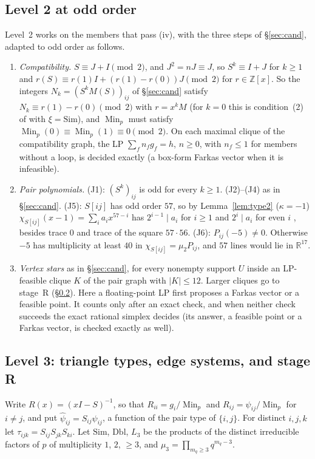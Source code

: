 \documentclass[11pt]{article}
\theoremstyle{definition}
\newcommand{\Z}{\mathbb{Z}}
\newcommand{\R}{\mathbb{R}}
\newcommand{\Min}{\operatorname{Min}}
\begin{document}
\subsection{Level 2 at odd order}
Level~2 works on the members that pass (iv), with the three steps of \S\ref{sec:cand}, adapted to odd
order as follows.
\begin{enumerate}
\item \emph{Compatibility.} $S\equiv J+I\pmod2$, and $J^2=nJ\equiv J$, so $S^k\equiv I+J$ for
$k\ge1$ and $r(S)\equiv r(1)I+(r(1)-r(0))J\pmod2$ for $r\in\Z[x]$. So the integers
$N_k=(S^kM(S))_{ij}$ of \S\ref{sec:cand} satisfy $N_k\equiv r(1)-r(0)\pmod2$ with $r=x^kM$ (for
$k=0$ this is condition~(2) of \cite[\S4]{GSY23} with $\xi=\mathrm{Sim}$), and $\Min_p$ must satisfy
$\Min_p(0)\equiv\Min_p(1)\equiv0\pmod2$. On each maximal clique
of the compatibility graph, the LP $\sum_fn_fg_f=h$, $n\ge0$, with $n_f\le1$ for members without a loop,
is decided exactly (a box-form Farkas vector when it is infeasible).
\item \emph{Pair polynomials.} (J1): $(S^k)_{ij}$ is odd for every $k\ge1$. (J2)--(J4) as in
\S\ref{sec:cand}. (J5): $S[ij]$ has odd order $57$, so by Lemma~\ref{lem:type2} ($\kappa=-1$)
$\chi_{S[ij]}(x-1)=\sum_ia_ix^{57-i}$ has $2^{i-1}\mid a_i$ for $i\ge1$ and $2^i\mid a_i$ for even $i$
\cite[Thm.~2.5]{GSY21}, besides trace $0$ and trace of the square $57\cdot56$. (J6): $P_{ij}(-5)\neq0$. Otherwise $-5$ has
multiplicity at least $40$ in $\chi_{S[ij]}=\mu_2P_{ij}$, and $57$ lines would lie in $\R^{17}$.
\item \emph{Vertex stars} as in \S\ref{sec:cand}, for every nonempty support $U$ inside an LP-feasible
clique $K$ of the pair graph with $|K|\le12$. Larger cliques go to stage~R (\S\ref{sec:59l3}).
Here a floating-point LP first proposes a Farkas vector or a feasible point. It counts only after an
exact check, and when neither check succeeds the exact rational simplex decides (its answer, a
feasible point or a Farkas vector, is checked exactly as well).
\end{enumerate}

\subsection{Level 3: triangle types, edge systems, and stage R}\label{sec:59l3}
Write $R(x)=(xI-S)^{-1}$, so that $R_{ii}=g_i/\Min_p$ and $R_{ij}=\psi_{ij}/\Min_p$ for $i\ne j$, and
put $\widehat\psi_{ij}=S_{ij}\psi_{ij}$, a function of the pair type of $\{i,j\}$. For distinct
$i,j,k$ let $\tau_{ijk}=S_{ij}S_{jk}S_{ki}$. Let $\mathrm{Sim}$, $\mathrm{Dbl}$, $L_3$ be the products of
the distinct irreducible factors of $p$ of multiplicity $1$, $2$, $\ge3$, and
$\mu_3=\prod_{m_q\ge3}q^{m_q-3}$.
\end{document}
